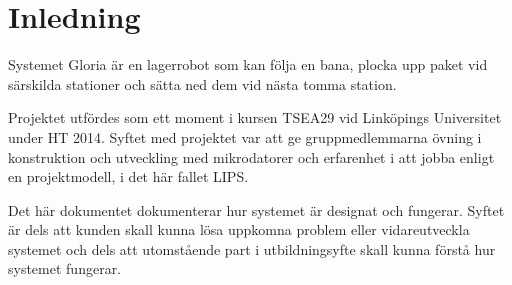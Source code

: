 
\section{Inledning}

Systemet Gloria är en lagerrobot som kan följa en bana, plocka upp paket vid särskilda stationer och sätta ned dem vid nästa tomma station.

Projektet utfördes som ett moment i kursen TSEA29 vid Linköpings Universitet under HT 2014\cite{tsea29}. Syftet med projektet var att ge gruppmedlemmarna övning i konstruktion och utveckling med mikrodatorer och erfarenhet i att jobba enligt en projektmodell, i det här fallet LIPS.

Det här dokumentet dokumenterar hur systemet är designat och fungerar. Syftet är dels att kunden skall kunna lösa uppkomna problem eller vidareutveckla systemet och dels att utomstående part i utbildningsyfte skall kunna förstå hur systemet fungerar.
